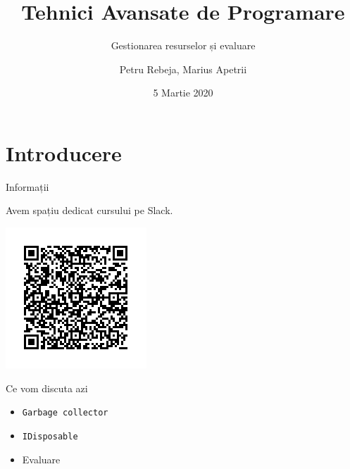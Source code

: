 \documentclass[presentation]{beamer}
\author{Petru Rebeja, Marius Apetrii}
\date{5 Martie 2020}
\title{Tehnici Avansate de Programare}
\subtitle{Gestionarea resurselor și evaluare}
\institute[UAIC]{Facultatea de Matematică\\Universitatea Alexandru Ioan Cuza, Iași}
\begin{document}
\maketitle
\section{Introducere}
\label{sec:org22379c3}
\begin{frame}[label={sec:org2136e44}]{Informații}
\begin{center}
Avem spațiu dedicat cursului pe Slack.
\end{center}
\begin{center}
\includegraphics[height=0.6\textheight]{img/tap-2020-slack-invite.png}
\end{center}
\end{frame}
\begin{frame}[label={sec:org4f9032a},fragile]{Ce vom discuta azi}
 \begin{itemize}
\item \texttt{Garbage collector}
\item \texttt{IDisposable}
\item Evaluare
\end{itemize}
\end{frame}
\end{document}
